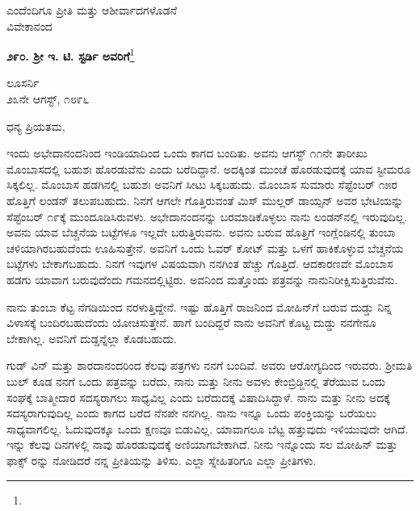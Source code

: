 {\flushright
ಎಂದೆಂದಿಗೂ ಪ್ರೀತಿ ಮತ್ತು ಆಶೀರ್ವಾದಗಳೊಡನೆ\\ವಿವೇಕಾನಂದ\par}

\begin{center}
\textbf{೨೯೦. ಶ‍್ರೀ ಇ. ಟಿ. ಸ್ಟರ್ಡಿ ಅವರಿಗೆ}\footnote{}
\end{center}


\vspace{-0.5cm}

\begin{flushright}
ಲೂಸರ್ನಿ\\೨೩ನೇ ಆಗಸ್ಟ್, ೧೮೯೬
\end{flushright}

\vspace{-0.45cm}

\noindent
ಧನ್ಯ ಪ್ರಿಯತಮ,

ಇಂದು ಅಭೇದಾನಂದನಿಂದ ಇಂಡಿಯಾದಿಂದ ಒಂದು ಕಾಗದ ಬಂದಿತು. ಅವನು ಆಗಸ್ಟ್ ೧೧ನೇ ತಾರೀಖು  ಮೊಂಬಾಸದಲ್ಲಿ ಬಹುಶಃ ಹೊರಡುವೆನು ಎಂದು ಬರೆದಿದ್ದಾನೆ. ಅದಕ್ಕಿಂತ ಮುಂಚೆ ಹೊರಡುವುದಕ್ಕೆ ಯಾವ ಸ್ಟೀಮರೂ ಸಿಕ್ಕಲಿಲ್ಲ. ಮೊಂಬಾಸ ಹಡಗಿನಲ್ಲಿ ಬಹುಶಃ ಅವನಿಗೆ ಸೀಟು ಸಿಕ್ಕಬಹುದು. ಮೊಂಬಾಸ ಸುಮಾರು ಸೆಪ್ಟೆಂಬರ್ ೧೫ರ ಹೊತ್ತಿಗೆ ಲಂಡನ್ ತಲುಪಬಹುದು. ನಿನಗೆ ಆಗಲೇ ಗೊತ್ತಿರುವಂತೆ ಮಿಸ್ ಮುಲ್ಲರ್ ಡಾಯ್ಸನ್ ಅವರ ಭೇಟಿಯನ್ನು ಸೆಪ್ಟೆಂಬರ್ ೧೯ಕ್ಕೆ ಮುಂದೂಡಿಸಿರುವಳು. ಅಭೇದಾನಂದನನ್ನು ಬರಮಾಡಿಕೊಳ್ಳಲು ನಾನು ಲಂಡನ್‌ನಲ್ಲಿ ಇರುವುದಿಲ್ಲ. ಅವನು ಯಾವ ಬೆಚ್ಚನೆಯ ಬಟ್ಟೆಗಳೂ ಇಲ್ಲದೇ ಬರುತ್ತಿರುವನು. ಅವನು ಬರುವ ಹೊತ್ತಿಗೆ ಇಂಗ್ಲೆಂಡಿನಲ್ಲಿ ತುಂಬಾ ಚಳಿಯಾಗಿರಬಹುದೆಂದು ಊಹಿಸುತ್ತೇನೆ. ಅವನಿಗೆ ಒಂದು ಓವರ್ ಕೋಟ್ ಮತ್ತು ಒಳಗೆ ಹಾಕಿಕೊಳ್ಳುವ ಬೆಚ್ಚನೆಯ ಬಟ್ಟೆಗಳು ಬೇಕಾಗಬಹುದು. ನಿನಗೆ ಇವುಗಳ ವಿಷಯವಾಗಿ ನನಗಿಂತ ಹೆಚ್ಚು ಗೊತ್ತಿದೆ. ಆದಕಾರಣವೇ ಮೊಂಬಾಸ ಹಡಗು ಯಾವಾಗ ಬರುವುದೆಂದು ಗಮನದಲ್ಲಿಟ್ಟಿರು. ಅವನಿಂದ ಮತ್ತೊಂದು ಪತ್ರವನ್ನು ನಾನುನಿರೀಕ್ಷಿಸುತ್ತಿರುವೆನು.

ನಾನು ತುಂಬಾ ಕೆಟ್ಟ ನೆಗಡಿಯಿಂದ ನರಳುತ್ತಿದ್ದೇನೆ. ಇಷ್ಟು ಹೊತ್ತಿಗೆ ರಾಜನಿಂದ ಮೋಹಿನ್‌ಗೆ ಬರುವ ದುಡ್ಡು ನಿನ್ನ ವಿಳಾಸಕ್ಕೆ ಬಂದಿರಬಹುದೆಂದು ಯೋಚಿಸುತ್ತೇನೆ. ಹಾಗೆ ಬಂದಿದ್ದರೆ ನಾನು ಅವನಿಗೆ ಕೊಟ್ಟ ದುಡ್ಡು ನನಗೇನೂ ಬೇಕಾಗಿಲ್ಲ. ಅವನಿಗೆ ದುಡ್ಡನ್ನೆಲ್ಲಾ ಕೊಡಬಹುದು.

ಗುಡ್ ವಿನ್ ಮತ್ತು ಶಾರದಾನಂದರಿಂದ ಕೆಲವು ಪತ್ರಗಳು ನನಗೆ ಬಂದಿವೆ. ಅವರು ಆರೋಗ್ಯದಿಂದ ಇರುವರು. ಶ‍್ರೀಮತಿ ಬುಲ್ ಕೂಡ ನನಗೆ ಒಂದು ಪತ್ರವನ್ನು ಬರೆದು, ನಾನು ಮತ್ತು ನೀನು ಅವಳು ಕೇಂಬ್ರಿಡ್ಜಿನಲ್ಲಿ ತೆರೆಯುವ ಒಂದು ಸಂಘಕ್ಕೆ ಬಾತ್ಮೀದಾರ ಸದಸ್ಯರಾಗಲು ಸಾಧ್ಯವಿಲ್ಲ ಎಂದು ಬರೆದುದಕ್ಕೆ ವಿಷಾದಿಸಿದ್ದಾಳೆ. ನಾನು ಮತ್ತು ನೀನು ಅದಕ್ಕೆ ಸದಸ್ಯರಾಗುವುದಿಲ್ಲ ಎಂದು ಕಾಗದ ಬರೆದ ನೆನಪೇ ನನಗಿಲ್ಲ. ನಾನು ಇನ್ನೂ ಒಂದು ಪಂಕ್ತಿಯನ್ನು ಬರೆಯಲು ಸಾಧ್ಯವಾಗಲಿಲ್ಲ. ಓದುವುದಕ್ಕೂ ಒಂದು ಕ್ಷಣವೂ ಬಿಡುವಿಲ್ಲ. ಯಾವಾಗಲೂ ಬೆಟ್ಟ ಹತ್ತುವುದು ಇಳಿಯುವುದೇ ಆಗಿದೆ. ಇನ್ನು ಕೆಲವು ದಿನಗಳಲ್ಲಿ ನಾವು ಹೊರಡುವುದಕ್ಕೆ ಅಣಿಯಾಗಬೇಕಾಗಿದೆ. ನೀನು ಇನ್ನೊಂದು ಸಲ ಮೋಹಿನ್ ಮತ್ತು ಫಾಕ್ಸ್ ರನ್ನು ನೋಡಿದರೆ ನನ್ನ ಪ್ರೀತಿಯನ್ನು ತಿಳಿಸು. ಎಲ್ಲಾ ಸ್ನೇಹಿತರಿಗೂ ಎಲ್ಲಾ ಪ್ರೀತಿಗಳು.


